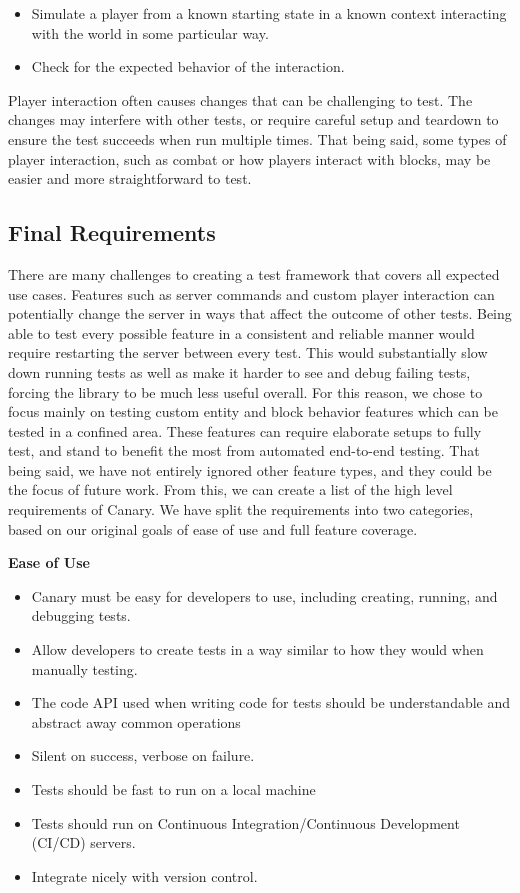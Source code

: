 \documentclass{article}
\begin{document}
\begin{onehalfspacing}
\begin{itemize}
\item
  Simulate a player from a known starting state in a known context
  interacting with the world in some particular way.
\item
  Check for the expected behavior of the interaction.
\end{itemize}

Player interaction often causes changes that can be challenging to test.
The changes may interfere with other tests, or require careful setup and
teardown to ensure the test succeeds when run multiple times. That being
said, some types of player interaction, such as combat or how players
interact with blocks, may be easier and more straightforward to test.

\subsection{Final Requirements}

There are many challenges to creating a test framework that covers all
expected use cases. Features such as server commands and custom player
interaction can potentially change the server in ways that affect the
outcome of other tests. Being able to test every possible feature in a
consistent and reliable manner would require restarting the server
between every test. This would substantially slow down running tests as
well as make it harder to see and debug failing tests, forcing the
library to be much less useful overall. For this reason, we chose to
focus mainly on testing custom entity and block behavior features which
can be tested in a confined area. These features can require elaborate
setups to fully test, and stand to benefit the most from automated
end-to-end testing. That being said, we have not entirely ignored other
feature types, and they could be the focus of future work. From this, we
can create a list of the high level requirements of Canary. We have
split the requirements into two categories, based on our original goals
of ease of use and full feature coverage.

\textbf{Ease of Use}

\begin{itemize}
\item
  Canary must be easy for developers to use, including creating,
  running, and debugging tests.
\item
  Allow developers to create tests in a way similar to how they would
  when manually testing.
\item
  The code API used when writing code for tests should be understandable
  and abstract away common operations
\item
  Silent on success, verbose on failure.
\item
  Tests should be fast to run on a local machine
\item
  Tests should run on Continuous Integration/Continuous Development
  (CI/CD) servers.
\item
  Integrate nicely with version control.
\end{itemize}


\end{onehalfspacing}
\end{document}
